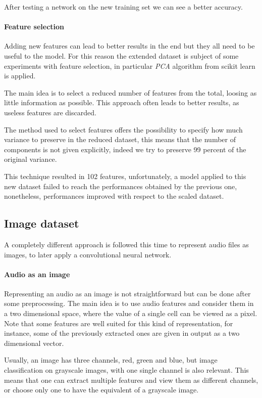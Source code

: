After testing a network on the new training set 
we can see a better accuracy.

\paragraph{Feature selection}
Adding new features can lead to better results 
in the end but they all need to be useful to the model.
For this reason the extended dataset is subject of some experiments 
with feature selection, in particular \emph{PCA} algorithm from scikit
learn is applied.~\cite{pca}

The main idea is to select a reduced number of features from the total, 
loosing as little information as possible. This approach often leads to better results, 
as useless features are discarded.

The method used to select features offers the possibility to specify how much 
variance to preserve in the reduced dataset, this means that the number of 
components is not given explicitly, indeed we try to preserve 99 percent of the original variance.

This technique resulted in 102 features, unfortunately, a model applied to this new dataset 
failed to reach the performances obtained by the previous one, nonetheless, performances
improved with respect to the scaled dataset.

\subsection{Image dataset}
A completely different approach is followed this time to represent audio files 
as images, to later apply a convolutional neural network.

\paragraph{Audio as an image}
Representing an audio as an image is not straightforward but can be done after 
some preprocessing.
The main idea is to use audio features and consider them in a two dimensional 
space, where the value of a single cell can be viewed as a pixel.
Note that some features are well suited for this kind of representation, for instance, 
some of the previously extracted ones are given in output as a two dimensional vector.

Usually, an image has three channels, red, green and blue, but 
image classification on grayscale images, with one single channel 
is also relevant. This means that one can extract multiple features and view them 
as different channels, or choose only one to have the equivalent of a grayscale image.

